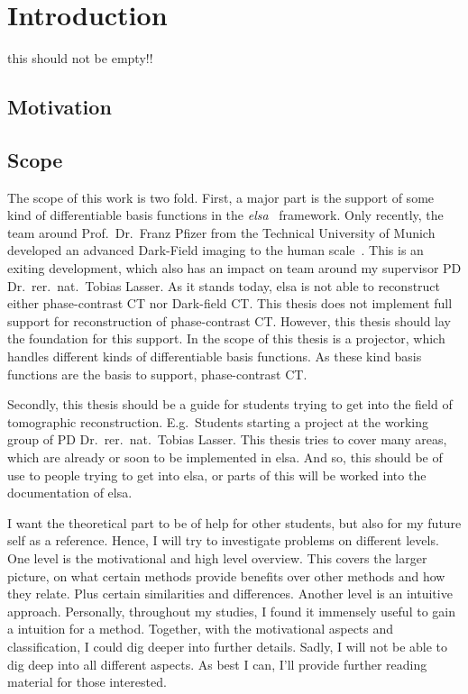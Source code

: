 \chapter{Introduction}\label{chap:introduction}

this should not be empty!!


\section{Motivation}\label{chap:Motivation}

\section{Scope}\label{chap:scope}

The scope of this work is two fold. First, a major part is the support of some kind of
differentiable basis functions in the \textit{elsa}~\cite{lasser_elsa_2019} framework. Only
recently, the team around Prof.\ Dr.\ Franz Pfizer from the Technical University of Munich developed
an advanced Dark-Field imaging to the human scale~\cite{viermetz_dark-field_2022}. This is an
exiting development, which also has an impact on team around my supervisor PD Dr.\ rer.\ nat.\
Tobias Lasser. As it stands today, elsa is not able to reconstruct either phase-contrast CT nor Dark-field
CT\@. This thesis does not implement full support for reconstruction of phase-contrast CT\@.
However, this thesis should lay the foundation for this support. In the scope of this thesis is a
projector, which handles different kinds of differentiable basis functions. As these kind basis
functions are the basis to support, phase-contrast CT\@.

Secondly, this thesis should be a guide for students trying to get into the field of tomographic
reconstruction. E.g.\ Students starting a project at the working group of PD Dr.\ rer.\ nat.\ Tobias
Lasser. This thesis tries to cover many areas, which are already or soon to be implemented in elsa.
And so, this should be of use to people trying to get into elsa, or parts of this will be worked
into the documentation of elsa.

I want the theoretical part to be of help for other students, but also for my future self as a
reference. Hence, I will try to investigate problems on different levels. One level is the
motivational and high level overview. This covers the larger picture, on what certain methods
provide benefits over other methods and how they relate. Plus certain similarities and differences.
Another level is an intuitive approach. Personally, throughout my studies, I found it immensely
useful to gain a intuition for a method. Together, with the motivational aspects and classification,
I could dig deeper into further details. Sadly, I will not be able to dig deep into all different
aspects. As best I can, I'll provide further reading material for those interested.

